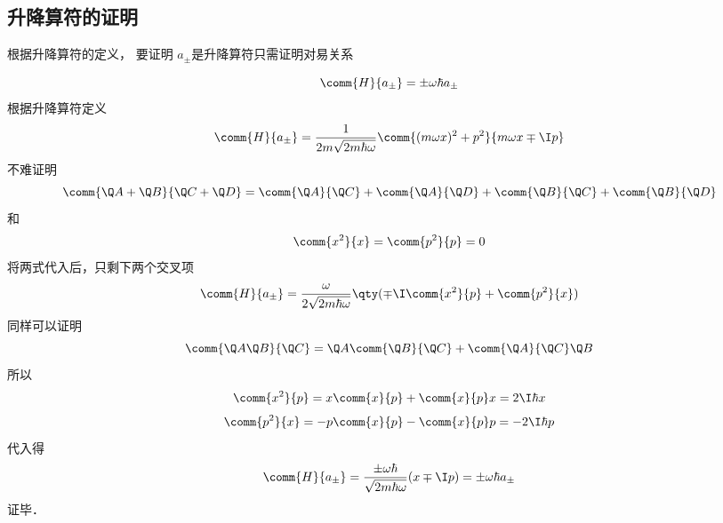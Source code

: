 \subsection{升降算符的证明}

根据升降算符的定义， 要证明 $a_\pm$是升降算符只需证明对易关系

\begin{equation}
\comm{H}{a_\pm} =  \pm \omega\hbar a_\pm
\end{equation}
根据升降算符定义
\begin{equation}
\comm{H}{a_\pm} = \frac{1}{2m\sqrt{2m\hbar \omega}} \comm{(m\omega x)^2 + p^2}{m\omega x \mp \I p}
\end{equation}
不难证明
\begin{equation}
\comm{\Q A + \Q B}{\Q C + \Q D} = \comm{\Q A}{\Q C} + \comm{\Q A}{\Q D} + \comm{\Q B}{\Q C} + \comm{\Q B}{\Q D}
\end{equation}
和
\begin{equation}
\comm{x^2}{x} = \comm{p^2}{p} = 0
\end{equation}
将两式代入后，只剩下两个交叉项
\begin{equation}
\comm{H}{a_\pm} = \frac{\omega}{2\sqrt{2m\hbar \omega}} \qty(\mp \I \comm{x^2}{p} + \comm{p^2}{x})
\end{equation}
同样可以证明
\begin{equation}
\comm{\Q A\Q B}{\Q C} = \Q A \comm{\Q B}{\Q C} + \comm{\Q A}{\Q C}\Q B
\end{equation}
所以
\begin{equation}
\comm{x^2}{p} = x\comm{x}{p} + \comm{x}{p} x = 2\I\hbar  x
\end{equation}
\begin{equation}
\comm{p^2}{x} =  -  p\comm{x}{p} - \comm{x}{p} p =  - 2\I\hbar  p
\end{equation}
代入得
\begin{equation}
\comm{H}{a_\pm} = \frac{\pm\omega\hbar}{\sqrt{2m\hbar\omega}} (x \mp \I p) =  \pm \omega\hbar a_ \pm
\end{equation}
证毕．
